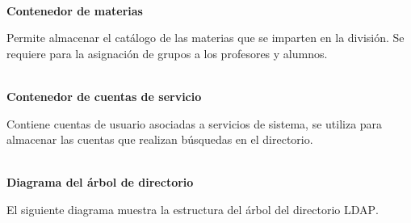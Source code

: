 \textbf{\\ Contenedor de materias \\}

Permite almacenar el cat\'{a}logo de las materias que se imparten en la divisi\'{o}n. Se requiere para la asignaci\'{o}n de grupos a los profesores y alumnos.

\textbf{\\ Contenedor de cuentas de servicio \\}

Contiene cuentas de usuario asociadas a servicios de sistema, se utiliza para almacenar las cuentas que realizan b\'{u}squedas en el directorio.

\textbf{\\ Diagrama del \'{a}rbol de directorio \\}

El siguiente diagrama muestra la estructura del \'{a}rbol del directorio \textsc{LDAP}.

